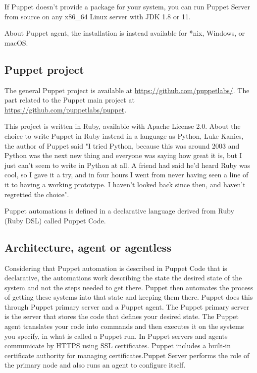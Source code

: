 \documentclass[12pt,a4paper,openright,twoside]{book}
\begin{document}
If Puppet doesn't provide a package for your system, you can run Puppet Server from source on any x86\_64 Linux server with JDK 1.8 or 11.
\cite{puppetDocSupportServer}

About Puppet agent, the installation is instead available for *nix, Windows, or macOS.
\cite{puppetDocSupportAgents}

\subsection{Puppet project}
The general Puppet project is available at \url{https://github.com/puppetlabs/}.
The part related to the Puppet main project at \url{https://github.com/puppetlabs/puppet}.

This project is written in Ruby, available with Apache License 2.0\cite{puppetGitHubProject}.
About the choice to write Puppet in Ruby instead in a language as Python, Luke Kanies, the author of Puppet said "I tried Python, because this was around 2003 and Python was the next new thing and everyone was saying how great it is, but I just can't seem to write in Python at all. A friend had said he'd heard Ruby was cool, so I gave it a try, and in four hours I went from never having seen a line of it to having a working prototype. I haven't looked back since then, and haven't regretted the choice"\cite{puppetDocOldFAQ}.

Puppet automations is defined in a declarative language derived from Ruby (Ruby DSL) called Puppet Code.

\subsection{Architecture, agent or agentless}
Considering that Puppet automation is described in Puppet Code that is declarative, the automations work describing the state the desired state of the system and not the steps needed to get there.
Puppet then automates the process of getting these systems into that state and keeping them there.
Puppet does this through Puppet primary server and a Puppet agent.
The Puppet primary server is the server that stores the code that defines your desired state.
The Puppet agent translates your code into commands and then executes it on the systems you specify, in what is called a Puppet run\cite{puppetDocWhatIs}.
In Puppet servers and agents communicate by HTTPS using SSL certificates. Puppet includes a built-in certificate authority for managing certificates.Puppet Server performs the role of the primary node and also runs an agent to configure itself\cite{puppetDocPlatform}.
\end{document}

